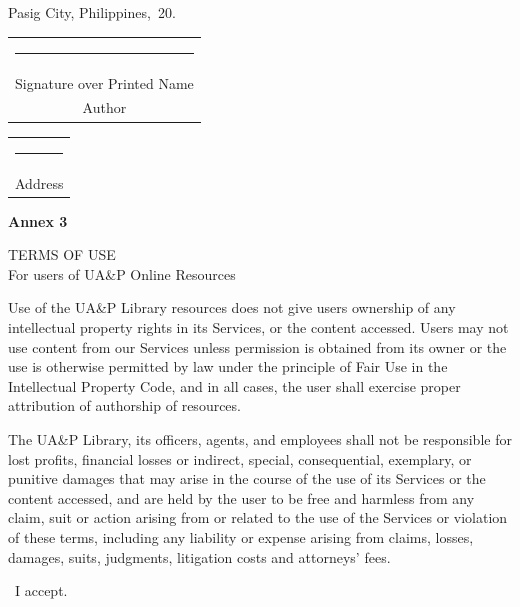 {\vspace{6pt}
\noindent Pasig City, Philippines, \underline{\makebox[1.4in]{}}\,20\underline{\makebox[0.4in]{}}.

\vspace{0.55in}
\hspace*{\fill}\begin{tabular}[t]{@{}c@{}}
\rule{2.7in}{0.4pt}\\
Signature over Printed Name\\
Author
\end{tabular}

\vspace{0.45in}
\hspace*{\fill}\begin{tabular}[t]{@{}c@{}}
\rule{2.7in}{0.4pt}\\
Address
\end{tabular}

\clearpage
{}
{}
\uapletterhead
\noindent\textbf{Annex 3}

\vspace{0.1in}
\begin{center}
{\large TERMS OF USE}\\
For users of UA\&P Online Resources
\end{center}

\vspace{0.2in}
\noindent Use of the UA\&P Library resources does not give users ownership of any intellectual property rights in its Services, or the content accessed. Users may not use content from our Services unless permission is obtained from its owner or the use is otherwise permitted by law under the principle of Fair Use in the Intellectual Property Code, and in all cases, the user shall exercise proper attribution of authorship of resources.

\vspace{8pt}
\noindent The UA\&P Library, its officers, agents, and employees shall not be responsible for lost profits, financial losses or indirect, special, consequential, exemplary, or punitive damages that may arise in the course of the use of its Services or the content accessed, and are held by the user to be free and harmless from any claim, suit or action arising from or related to the use of the Services or violation of these terms, including any liability or expense arising from claims, losses, damages, suits, judgments, litigation costs and attorneys' fees.

\vspace{0.2in}
\noindent\fbox{\rule{0pt}{1.7ex}\hspace{1.7ex}}\ I accept.

\par}
